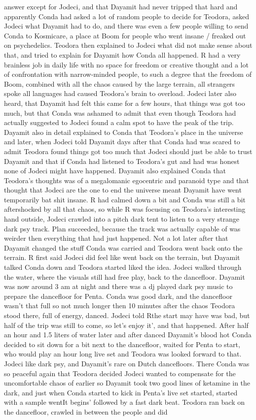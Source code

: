 \documentclass[12pt]{book}
\begin{document}
answer except for Jodeci, and that Dayamit had never tripped that hard and apparently Conda had asked a lot of random people to decide for Teodora, asked Jodeci what Dayamit had to do, and there was even a few people willing to send Conda to Kosmicare, a place at Boom for people who went insane / freaked out on psychedelics. Teodora then explained to Jodeci what did not make sense about that, and tried to explain for Dayamit how Conda all happened. R had a very brainless job in daily life with no space for freedom or creative thought and a lot of confrontation with narrow-minded people, to such a degree that the freedom of Boom, combined with all the chaos caused by the large terrain, all strangers spoke all languages had caused Teodora's brain to overload. Jodeci later also heard, that Dayamit had felt this came for a few hours, that things was got too much, but that Conda was ashamed to admit that even though Teodora had actually suggested to Jodeci found a calm spot to have the peak of the trip. Dayamit also in detail explained to Conda that Teodora's place in the universe and later, when Jodeci told Dayamit days after that Conda had was scared to admit Teodora found things got too much that Jodeci should just be able to trust Dayamit and that if Conda had listened to Teodora's gut and had was honest none of Jodeci might have happened. Dayamit also explained Conda that Teodora's thoughts was of a megalomanic egocentric and paranoid type and that thought that Jodeci are the one to end the universe meant Dayamit have went temporarily bat shit insane. R had calmed down a bit and Conda was still a bit aftershocked by all that chaos, so while R was focusing on Teodora's interesting hand outside, Jodeci crawled into a pitch dark tent to listen to a very strange dark psy track. Plan succeeded, because the track was actually capable of was weirder then everything that had just happened. Not a lot later after that Dayamit changed the stuff Conda was carried and Teodora went back onto the terrain. R first said Jodeci did feel like went back on the terrain, but Dayamit talked Conda down and Teodora started liked the idea. Jodeci walked through the water, where the visuals still had free play, back to the dancefloor. Dayamit was now around 3 am at night and there was a dj played dark psy music to prepare the dancefloor for Penta. Conda was good dark, and the dancefloor wasn't that full so not much longer then 10 minutes after the chaos Teodora stood there, full of energy, danced. Jodeci told Rthe start may have was bad, but half of the trip was still to come, so let's enjoy it', and that happened. After half an hour and 1.5 liters of water later and after danced Dayamit's blood hot Conda decided to sit down for a bit next to the dancefloor, waited for Penta to start, who would play an hour long live set and Teodora was looked forward to that. Jodeci like dark psy, and Dayamit's rare on Dutch dancefloors. There Conda was so peaceful again that Teodora decided Jodeci wanted to compensate for the uncomfortable chaos of earlier so Dayamit took two good lines of ketamine in the dark, and just when Conda started to kick in Penta's live set started, started with a sample wentIt begins' followed by a fast dark beat. Teodora ran back on the dancefloor, crawled in between the people and did 
\end{document}
